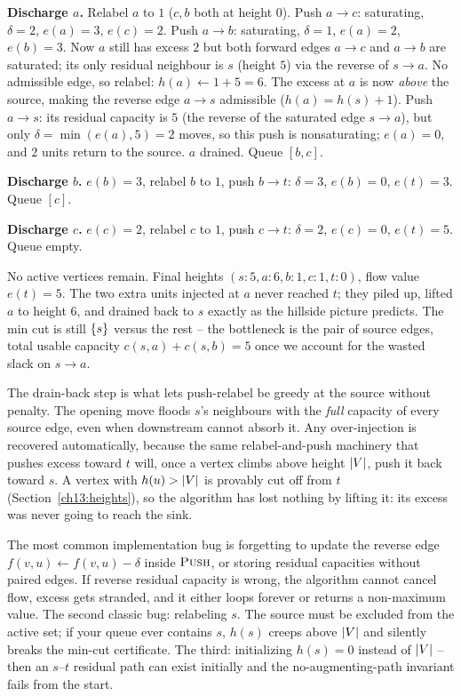 \textbf{Discharge $a$.} Relabel $a$ to $1$ ($c,b$ both at height $0$). Push $a\!\to\!c$: saturating, $\delta=2$, $e(a)=3$, $e(c)=2$. Push $a\!\to\!b$: saturating, $\delta=1$, $e(a)=2$, $e(b)=3$. Now $a$ still has excess $2$ but both forward edges $a\!\to\!c$ and $a\!\to\!b$ are saturated; its only residual neighbour is $s$ (height $5$) via the reverse of $s\!\to\!a$. No admissible edge, so relabel: $h(a)\gets 1+5=6$. The excess at $a$ is now \emph{above} the source, making the reverse edge $a\!\to\!s$ admissible ($h(a)=h(s)+1$). Push $a\!\to\!s$: its residual capacity is $5$ (the reverse of the saturated edge $s\!\to\!a$), but only $\delta=\min(e(a),5)=2$ moves, so this push is nonsaturating; $e(a)=0$, and $2$ units return to the source. $a$ drained. Queue $[b,c]$.

\textbf{Discharge $b$.} $e(b)=3$, relabel $b$ to $1$, push $b\!\to\!t$: $\delta=3$, $e(b)=0$, $e(t)=3$. Queue $[c]$.

\textbf{Discharge $c$.} $e(c)=2$, relabel $c$ to $1$, push $c\!\to\!t$: $\delta=2$, $e(c)=0$, $e(t)=5$. Queue empty.

No active vertices remain. Final heights $(s{:}5,a{:}6,b{:}1,c{:}1,t{:}0)$, flow value $e(t)=5$. The two extra units injected at $a$ never reached $t$; they piled up, lifted $a$ to height $6$, and drained back to $s$ exactly as the hillside picture predicts. The min cut is still $\{s\}$ versus the rest -- the bottleneck is the pair of source edges, total usable capacity $c(s,a)+c(s,b)=5$ once we account for the wasted slack on $s\!\to\!a$.

\begin{whybox}
The drain-back step is what lets push-relabel be greedy at the source without penalty. The opening move floods $s$'s neighbours with the \emph{full} capacity of every source edge, even when downstream cannot absorb it. Any over-injection is recovered automatically, because the same relabel-and-push machinery that pushes excess toward $t$ will, once a vertex climbs above height $\lvert V\rvert$, push it back toward $s$. A vertex with $h(u)>\lvert V\rvert$ is provably cut off from $t$ (Section~\ref{ch13:heights}), so the algorithm has lost nothing by lifting it: its excess was never going to reach the sink.
\end{whybox}

\begin{trapbox}
The most common implementation bug is forgetting to update the reverse edge $f(v,u)\gets f(v,u)-\delta$ inside $\textsc{Push}$, or storing residual capacities without paired edges. If reverse residual capacity is wrong, the algorithm cannot cancel flow, excess gets stranded, and it either loops forever or returns a non-maximum value. The second classic bug: relabeling $s$. The source must be excluded from the active set; if your queue ever contains $s$, $h(s)$ creeps above $\lvert V\rvert$ and silently breaks the min-cut certificate. The third: initializing $h(s)=0$ instead of $\lvert V\rvert$ -- then an $s$--$t$ residual path can exist initially and the no-augmenting-path invariant fails from the start.
\end{trapbox}


